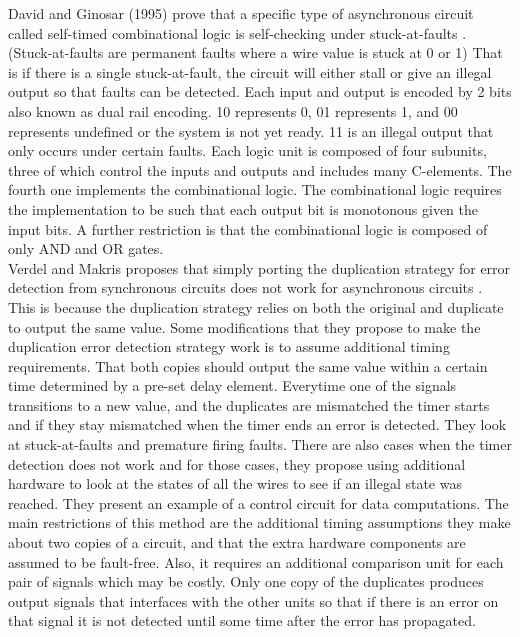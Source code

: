 \documentclass[12pt]{report}
\begin{document}
David and Ginosar (1995) prove that a specific type of asynchronous circuit called self-timed combinational logic is self-checking under stuck-at-faults \cite{self_timed}. (Stuck-at-faults are permanent faults where a wire value is stuck at 0 or 1) That is if there is a single stuck-at-fault, the circuit will either stall or give an illegal output so that faults can be detected. Each input and output is encoded by 2 bits also known as dual rail encoding. 10 represents 0, 01 represents 1, and 00 represents undefined or the system is not yet ready. 11 is an illegal output that only occurs under certain faults. Each logic unit is composed of four subunits, three of which control the inputs and outputs and includes many C-elements. The fourth one implements the combinational logic. The combinational logic requires the implementation to be such that each output bit is monotonous given the input bits. A further restriction is that the combinational logic is composed of only AND and OR gates.
\\

Verdel and Makris proposes that simply porting the duplication strategy for error detection from synchronous circuits does not work for asynchronous circuits \cite{async_dup_ced}. This is because the duplication strategy relies on both the original and duplicate to output the same value. Some modifications that they propose to make the duplication error detection strategy work is to assume additional timing requirements. That both copies should output the same value within a certain time determined by a pre-set delay element. Everytime one of the signals transitions to a new value, and the duplicates are mismatched the timer starts and if they stay mismatched when the timer ends an error is detected. They look at stuck-at-faults and premature firing faults. There are also cases when the timer detection does not work and for those cases, they propose using additional hardware to look at the states of all the wires to see if an illegal state was reached. They present an example of a control circuit for data computations. The main restrictions of this method are the additional timing assumptions they make about two copies of a circuit, and that the extra hardware components are assumed to be fault-free. Also, it requires an additional comparison unit for each pair of signals which may be costly. Only one copy of the duplicates produces output signals that interfaces with the other units so that if there is an error on that signal it is not detected until some time after the error has propagated.
\\
\end{document}
